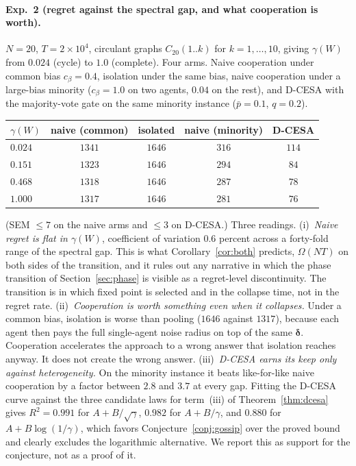 \documentclass[11pt]{article}
\begin{document}
\paragraph{Exp.~2 (regret against the spectral gap, and what
cooperation is worth).}
$N=20$, $T=2\times10^4$, circulant graphs $C_{20}(1..k)$ for
$k=1,\dots,10$, giving $\gamma(W)$ from $0.024$ (cycle) to $1.0$
(complete).  Four arms. Naive cooperation under common bias
$c_\beta=0.4$, isolation under the same bias, naive cooperation under
a large-bias minority ($c_\beta=1.0$ on two agents, $0.04$ on the
rest), and D-CESA with the majority-vote gate on the same minority
instance ($\bar p=0.1$, $q=0.2$).
\begin{center}
\begin{tabular}{@{}lcccc@{}}
\toprule
$\gamma(W)$ & naive (common) & isolated & naive (minority) & D-CESA \\
\midrule
$0.024$ & $1341$ & $1646$ & $316$ & $114$\\
$0.151$ & $1323$ & $1646$ & $294$ & $84$\\
$0.468$ & $1318$ & $1646$ & $287$ & $78$\\
$1.000$ & $1317$ & $1646$ & $281$ & $76$\\
\bottomrule
\end{tabular}
\end{center}
(SEM $\leq7$ on the naive arms and $\leq3$ on D-CESA.)  Three
readings.
(i)~\emph{Naive regret is flat in $\gamma(W)$}, coefficient of
variation $0.6$ percent across a forty-fold range of the spectral gap.
This is what Corollary~\ref{cor:both} predicts, $\Omega(NT)$ on both
sides of the transition, and it rules out any narrative in which the
phase transition of Section~\ref{sec:phase} is visible as a
regret-level discontinuity. The transition is in which fixed point is
selected and in the collapse time, not in the regret rate.
(ii)~\emph{Cooperation is worth something even when it collapses.}
Under a common bias, isolation is worse than pooling ($1646$ against
$1317$), because each agent then pays the full single-agent noise
radius on top of the same $\bm\delta$.  Cooperation accelerates the
approach to a wrong answer that isolation reaches anyway. It does not
create the wrong answer.
(iii)~\emph{D-CESA earns its keep only against heterogeneity.}  On the
minority instance it beats like-for-like naive cooperation by a factor
between $2.8$ and $3.7$ at every gap.
Fitting the D-CESA curve against the three candidate laws for
term~(iii) of Theorem~\ref{thm:dcesa} gives $R^2=0.991$ for
$A+B/\sqrt\gamma$, $0.982$ for $A+B/\gamma$, and $0.880$ for
$A+B\log(1/\gamma)$, which favors Conjecture~\ref{conj:gossip} over
the proved bound and clearly excludes the logarithmic alternative.
We report this as support for the conjecture, not as a proof of it.
\end{document}

